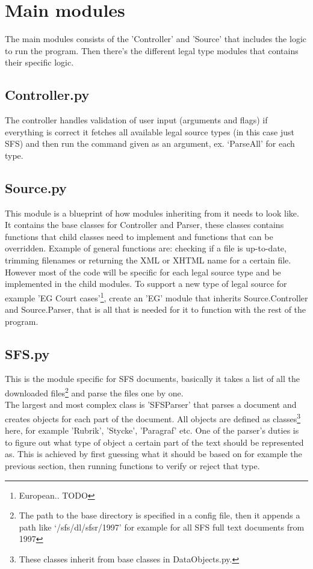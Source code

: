 \section{Main modules}

The main modules consists of the 'Controller' and 'Source' that includes the logic to run the program. Then there's the different legal type modules that contains their specific logic.  

\subsection{Controller.py}
The controller handles validation of user input (arguments and flags) if everything is correct it fetches all available legal source types (in this case just SFS) and then run the command given as an argument, ex. ‘ParseAll’ for each type.

\subsection{Source.py}
This module is a blueprint of how modules inheriting from it needs to look like. It contains the base classes for Controller and Parser, these classes contains functions that child classes need to implement and functions that can be overridden. Example of general functions are: checking if a file is up-to-date, trimming filenames or returning the XML or XHTML name for a certain file.\\
However most of the code will be specific for each legal source type and be implemented in the child modules. To support a new type of legal source for example 'EG Court cases'\footnote{European.. TODO}, create an 'EG' module that inherits Source.Controller and Source.Parser, that is all that is needed for it to function with the rest of the program.

\subsection{SFS.py}
This is the module specific for SFS documents, basically it takes a list of all the downloaded files\footnote{The path to the base directory is specified in a config file, then it appends a path like ‘/sfs/dl/sfsr/1997’ for example for all SFS full text documents from 1997} and parse the files one by one.\\
The largest and most complex class is 'SFSParser' that parses a document and creates objects for each part of the document. All objects are defined as classes\footnote{These classes inherit from base classes in DataObjects.py.} here, for example 'Rubrik', 'Stycke', 'Paragraf' etc. One of the parser's duties is to figure out what type of object a certain part of the text should be represented as. This is achieved by first guessing what it should be based on for example the previous section, then running functions to verify or reject that type.

